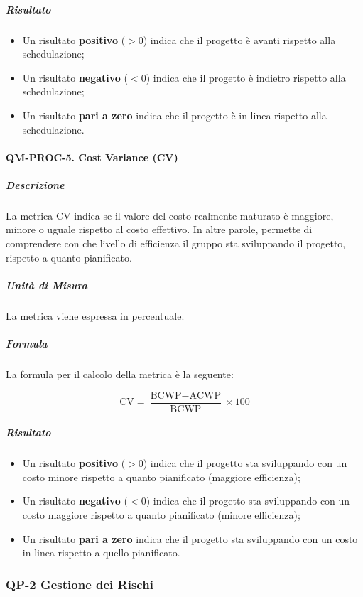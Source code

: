 				\subparagraph{Risultato}
				\begin{itemize}
					\item Un risultato \textbf{positivo} (\(> 0\)) indica che il progetto è avanti rispetto alla schedulazione;
					\item Un risultato \textbf{negativo} (\(< 0\)) indica che il progetto è indietro rispetto alla schedulazione;
					\item Un risultato \textbf{pari a zero} indica che il progetto è in linea rispetto alla schedulazione.
				\end{itemize}

			\paragraph{QM-PROC-5. Cost Variance (CV)}

				\subparagraph{Descrizione}
				La metrica CV indica se il valore del costo realmente maturato è maggiore, minore o uguale rispetto al costo effettivo. In altre parole, permette di comprendere con che livello di efficienza il gruppo sta sviluppando il progetto, rispetto a quanto pianificato.

				\subparagraph{Unità di Misura}
				La metrica viene espressa in percentuale.

				\subparagraph{Formula}
				La formula per il calcolo della metrica è la seguente:

				\[
					\text{CV} = \frac{\text{BCWP} - \text{ACWP}}{\text{BCWP}} \times 100
				\]

				\subparagraph{Risultato}
				\begin{itemize}
					\item Un risultato \textbf{positivo} (\(> 0\)) indica che il progetto sta sviluppando con un costo minore rispetto a quanto pianificato (maggiore efficienza);
					\item Un risultato \textbf{negativo} (\(< 0\)) indica che il progetto sta sviluppando con un costo maggiore rispetto a quanto pianificato (minore efficienza);
					\item Un risultato \textbf{pari a zero} indica che il progetto sta sviluppando con un costo in linea rispetto a quello pianificato.
				\end{itemize}

		\subsubsection{QP-2 Gestione dei Rischi}

